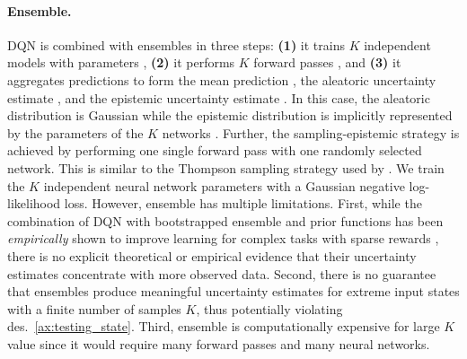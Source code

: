 \paragraph{Ensemble.} DQN is combined with ensembles \cite{ensembles} in three steps: \textbf{(1)} it trains $K$ independent models with parameters , \textbf{(2)} it performs $K$ forward passes , and \textbf{(3)} it aggregates predictions to form the mean prediction , the aleatoric uncertainty estimate , and the epistemic uncertainty estimate . In this case, the aleatoric distribution is Gaussian while the epistemic distribution is implicitly represented by the parameters of the $K$ networks . Further, the sampling-epistemic strategy is achieved by performing one single forward pass with one randomly selected network. This is similar to the Thompson sampling strategy used by \cite{bootstrapped-dqn}. We train the $K$ independent neural network parameters  with a Gaussian negative log-likelihood loss. However, ensemble has multiple limitations. First, while the combination of DQN with bootstrapped ensemble and prior functions has been \emph{empirically} shown to improve learning for complex tasks with sparse rewards \cite{bootstrapped-dqn, randomized-prior-functions}, there is no explicit theoretical or empirical evidence that their uncertainty estimates concentrate with more observed data. Second, there is no guarantee that ensembles produce meaningful uncertainty estimates for extreme input states with a finite number of samples $K$, thus potentially violating des.~\ref{ax:testing_state}. Third, ensemble is computationally expensive for large $K$ value since it would require many forward passes and many neural networks. 


